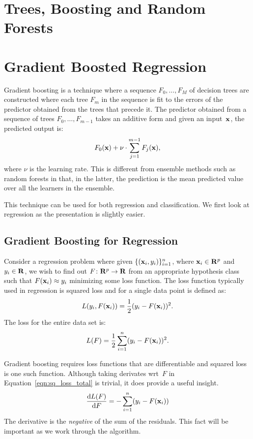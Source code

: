\chapter{Trees, Boosting and Random Forests}

\chapter{Gradient Boosted Regression}

Gradient boosting is a technique where a sequence 
$F_0, \ldots, F_M$ of decision trees are constructed where 
each tree $F_m$ in the sequence is fit to the errors of the 
predictor obtained from the trees that precede it. The predictor obtained 
from a sequence of trees $F_0, \ldots, F_{m - 1}$ takes an additive 
form and given an input~$\mathbf{x}$, the predicted output is:
\begin{equation}
    F_0(\mathbf{x}) + \nu \cdot \sum_{j = 1}^{m - 1} F_j(\mathbf{x}),
\end{equation}  
where $\nu$ is the learning rate. This is different from ensemble methods 
such as random forests in that, in the latter, the prediction is the mean predicted 
value over all the learners in the ensemble. 

This technique can be used for both regression and classification. We first look
at regression as the presentation is slightly easier.

\section{Gradient Boosting for Regression}
Consider a regression problem where given $\{ (\mathbf{x}_i, y_i)\}_{i = 1}^n$, 
where $\mathbf{x}_i \in \mathbf{R}^p$ and $y_i \in \mathbf{R}$, we wish to find out 
$F \colon \mathbf{R}^p \to \mathbf{R}$ from an appropriate hypothesis class 
such that $F(\mathbf{x}_i) \approx y_i$ minimizing some 
loss function. The loss function typically used in regression is squared loss
and for a single data point is defined as:
\begin{equation}  
    \label{eqn:sq_loss_single}
    L(y_i, F(\mathbf{x}_i)) = \frac{1}{2} (y_i - F(\mathbf{x}_i))^2. 
\end{equation}
The loss for the entire data set is:
\begin{equation}
    \label{eqn:sq_loss_total}
    L(F) = \frac{1}{2} \sum_{i = 1}^{n} (y_i - F(\mathbf{x}_i))^2.
\end{equation}

Gradient boosting requires loss functions that are differentiable and squared loss
is one such function. Although taking derivates wrt~$F$ 
in Equation~\ref{eqn:sq_loss_total} is trivial, it does provide a useful insight.
\begin{equation}
    \frac{\mathrm{d} L(F)}{\mathrm{d} F} 
        = - \sum_{i = 1}^n (y_i - F(\mathbf{x}_i))   
\end{equation}
The derivative is the \emph{negative} of the sum of the residuals. This fact 
will be important as we work through the algorithm.

